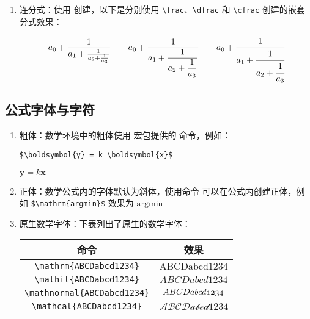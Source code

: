 \begin{enumerate}
\item 连分式：使用 \boxforcmd{\\cfrac} 创建，以下是分别使用 \verb|\frac|、\verb|\dfrac| 和 \verb|\cfrac| 创建的嵌套分式效果：

\begin{tcolorbox}[colback=white]
\[
    a_0+\frac{1}{a_1+\frac{1}{a_2+\frac{1}{a_3}}}
    \qquad
    a_0+\dfrac{1}{a_1+\dfrac{1}{a_2+\dfrac{1}{a_3}}}
    \qquad
    a_0+\cfrac{1}{a_1+\cfrac{1}{a_2+\cfrac{1}{a_3}}}
\]
\end{tcolorbox}


\end{enumerate}
\subsection{公式字体与字符}
\begin{enumerate}

\item 粗体：数学环境中的粗体使用  宏包提供的 \boxforcmd{\\boldsymbol\{\}} 命令，例如：

\begin{tcolorbox}[sidebyside]
\begin{lstlisting}
$\boldsymbol{y} = k \boldsymbol{x}$
\end{lstlisting} 

\tcblower

$\boldsymbol{y} = k \boldsymbol{x} $
\end{tcolorbox}

\item 正体：数学公式内的字体默认为斜体，使用命令 \boxforcmd{\\mathrm\{\}} 可以在公式内创建正体，例如 \verb|$\mathrm{argmin}$| 效果为 $\mathrm{argmin}$

\item 原生数学字体：下表列出了原生的数学字体：

\begin{tcolorbox}[colback=white]
\begin{center}
\begin{tabular}{cc}
    命令 & 效果 \\
    \hline
    \verb|\mathrm{ABCDabcd1234}| & $\mathrm{ABCDabcd1234}$ \\
    \verb|\mathit{ABCDabcd1234}| & $\mathit{ABCDabcd1234}$ \\
    \verb|\mathnormal{ABCDabcd1234}| & $\mathnormal{ABCDabcd1234}$ \\
    \verb|\mathcal{ABCDabcd1234}| & $\mathcal{ABCDabcd1234}$ \\
\end{tabular}
\end{center}
\end{tcolorbox}


\end{enumerate}

